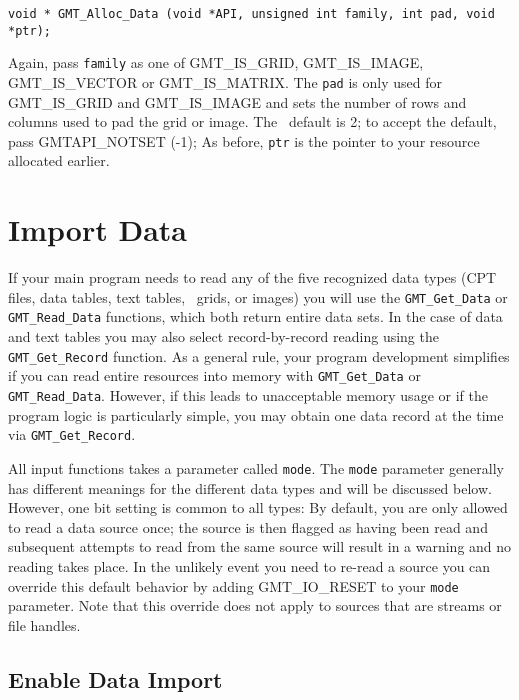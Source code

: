 \documentclass[11pt]{report}
\begin{document}

\begin{verbatim}
void * GMT_Alloc_Data (void *API, unsigned int family, int pad, void *ptr);
\end{verbatim}
Again, pass \texttt{family} as one of GMT\_IS\_GRID, GMT\_IS\_IMAGE, GMT\_IS\_VECTOR or GMT\_IS\_MATRIX.
The \texttt{pad} is only used for GMT\_IS\_GRID and GMT\_IS\_IMAGE and sets the number of
rows and columns used to pad the grid or image.  The \GMT\ default is 2; to accept the default,
pass GMTAPI\_NOTSET (-1);  As before, \texttt{ptr} is the pointer to your resource allocated earlier.

\section{Import Data}

If your main program needs to read any of the five recognized data types (CPT files, data tables, text tables, \GMT\ grids, or images)
you will use the \texttt{GMT\_Get\_Data} or \texttt{GMT\_Read\_Data} functions, which both return entire data sets.
In the case of data and text tables you may also select record-by-record reading using the \texttt{GMT\_Get\_Record} function.
As a general rule, your program development simplifies if you can read entire resources into memory with
\texttt{GMT\_Get\_Data} or \texttt{GMT\_Read\_Data}.  However, if this leads to unacceptable memory usage or if the program logic is particularly simple,
you may obtain one data record at the time via \texttt{GMT\_Get\_Record}.

All input functions takes a parameter called \texttt{mode}.  The \texttt{mode} parameter generally
has different meanings for the different data types and will be discussed below.
However, one bit setting is common to all types: By default, you are only allowed to read a
data source once; the source is then flagged as having been read and subsequent attempts to read
from the same source will result in a warning and no reading takes place.  In the unlikely event you need to re-read a
source you can override this default behavior by adding GMT\_IO\_RESET to your \texttt{mode} parameter.
Note that this override does not apply to sources that are streams or file handles.

\subsection{Enable Data Import}
\end{document}
